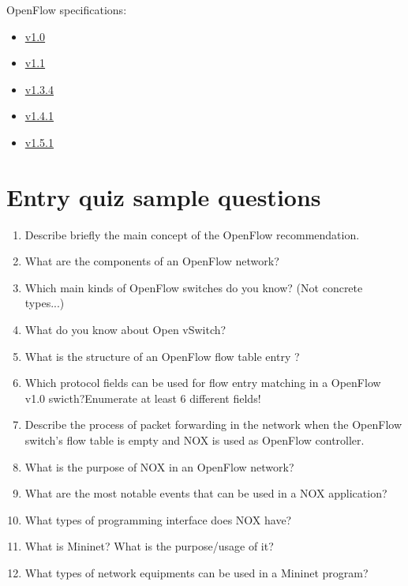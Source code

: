 \documentclass{article}
\begin{document}
OpenFlow specifications:
\begin{itemize}
    \item
          \href{https://qosip.tmit.bme.hu/foswiki/pub/Meres/OpenFlowMScMeresiSegedlet/openflow-spec-v1.0.0.pdf}{v1.0}
    \item
          \href{https://qosip.tmit.bme.hu/foswiki/pub/Meres/OpenFlowMScMeresiSegedlet/openflow-spec-v1.1.0.pdf}{v1.1}
    \item
          \href{https://qosip.tmit.bme.hu/foswiki/pub/Meres/OpenFlowMScMeresiSegedlet/openflow-switch-v1.3.4.pdf}{v1.3.4}
    \item
          \href{https://qosip.tmit.bme.hu/foswiki/pub/Meres/OpenFlowMScMeresiSegedlet/openflow-switch-v1.4.1.pdf}{v1.4.1}
    \item
          \href{https://qosip.tmit.bme.hu/foswiki/pub/Meres/OpenFlowMScMeresiSegedlet/openflow-switch-v1.5.1.pdf}{v1.5.1}

\end{itemize}

\appendix

\section{Entry quiz sample questions}

\begin{enumerate}
    \item Describe briefly the main concept of the OpenFlow recommendation.
    \item What are the components of an OpenFlow network?
    \item Which main kinds of OpenFlow switches do you know? (Not concrete types...)
    \item What do you know about Open vSwitch?
    \item What is the structure of an OpenFlow flow table entry ?
    \item Which protocol fields can be used for flow entry matching in a OpenFlow v1.0 swicth?Enumerate at least 6 different fields!
    \item Describe the process of packet forwarding in the network when the OpenFlow switch's flow table is empty and NOX is used as OpenFlow controller.
    \item What is the purpose of NOX in an OpenFlow network?
    \item What are the most notable events that can be used in a NOX application?
    \item What types of programming interface does NOX have?
    \item What is Mininet? What is the purpose/usage of it?
    \item What types of network equipments can be used in a Mininet program? 
\end{enumerate}
\end{document}
